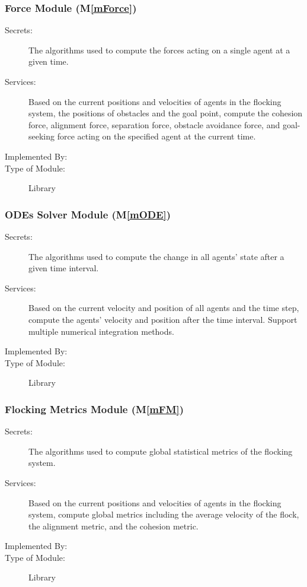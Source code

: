 \documentclass[12pt, titlepage]{article}
\newcommand{\mref}[1]{M\ref{#1}}
\begin{document}
\subsubsection{Force Module (\mref{mForce})}

\begin{description}
\item[Secrets:] The algorithms used to compute the forces acting on a single 
agent at a given time.
\item[Services:] Based on the current positions and velocities of agents in 
the flocking system, the positions of obstacles and the goal point, compute 
the cohesion force, alignment force, separation force, obstacle avoidance 
force, and goal-seeking force acting on the specified agent at the current time.
\item[Implemented By:] \progname{}
\item[Type of Module:] Library
\end{description}

\subsubsection{ODEs Solver Module (\mref{mODE})}

\begin{description}
\item[Secrets:] The algorithms used to compute the change in all agents' state 
after a given time interval.
\item[Services:] Based on the current velocity and position of all agents and 
the time step, compute the agents' velocity and position after the time interval. 
Support multiple numerical integration methods.
\item[Implemented By:] \progname{}
\item[Type of Module:] Library
\end{description}

\subsubsection{Flocking Metrics Module (\mref{mFM})}

\begin{description}
\item[Secrets:] The algorithms used to compute global statistical metrics of 
the flocking system.
\item[Services:] Based on the current positions and velocities of agents in 
the flocking system, compute global metrics including the average velocity of 
the flock, the alignment metric, and the cohesion metric.
\item[Implemented By:] \progname{}
\item[Type of Module:] Library
\end{description}
\end{document}
